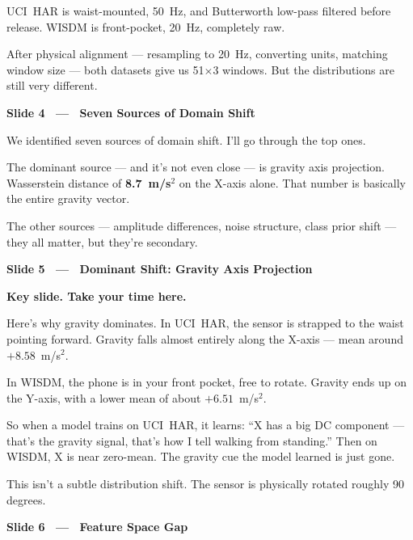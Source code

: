 \documentclass[12pt]{article}
\newcommand{\slidetitle}[1]{%
  \vspace{14pt}%
  \noindent\colorbox{pennblue}{\parbox{\dimexpr\textwidth-2\fboxsep\relax}{%
    \strut\bfseries\color{white}\quad #1\strut}}%
  \vspace{4pt}\par
}
\newcommand{\timing}[1]{%
  \noindent{\small\bfseries\color{pennred}#1}\quad\par\vspace{2pt}%
}
\begin{document}
UCI~HAR is waist-mounted, 50~Hz, and Butterworth low-pass filtered before
release. WISDM is front-pocket, 20~Hz, completely raw.

After physical alignment --- resampling to 20~Hz, converting units, matching
window size --- both datasets give us 51$\times$3 windows.
But the distributions are still very different.

\slidetitle{Slide 4 \ — \ Seven Sources of Domain Shift}
\timing{[1:30 – 2:00]}

We identified seven sources of domain shift. I'll go through the top ones.

The dominant source --- and it's not even close --- is gravity axis projection.
Wasserstein distance of \textbf{8.7~m/s$^2$} on the X-axis alone.
That number is basically the entire gravity vector.

The other sources --- amplitude differences, noise structure, class prior shift
--- they all matter, but they're secondary.

\slidetitle{Slide 5 \ — \ Dominant Shift: Gravity Axis Projection}
\timing{[2:00 – 3:00]}
\begin{slidebox}
\textcolor{pennred}{\textbf{Key slide. Take your time here.}}
\end{slidebox}

Here's why gravity dominates. In UCI~HAR, the sensor is strapped to the
waist pointing forward. Gravity falls almost entirely along the X-axis ---
mean around $+8.58$~m/s$^2$.

In WISDM, the phone is in your front pocket, free to rotate. Gravity ends up
on the Y-axis, with a lower mean of about $+6.51$~m/s$^2$.

So when a model trains on UCI~HAR, it learns: ``X has a big DC component ---
that's the gravity signal, that's how I tell walking from standing.'' Then on
WISDM, X is near zero-mean. The gravity cue the model learned is just gone.

This isn't a subtle distribution shift. The sensor is physically rotated
roughly 90 degrees.

\slidetitle{Slide 6 \ — \ Feature Space Gap}
\timing{[3:00 – 3:30]}
\end{document}
